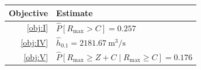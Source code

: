 \begin{tabularx}{\linewidth}{r>{\centering\arraybackslash}X}
\toprule  Objective & Estimate\\\midrule
  \ref{obj:I} & $\hat{P}[R_{\max} > C] = 0.257$\\\addlinespace
  \ref{obj:IV} & $\hat{h}_{0.1} = \qty{2181.67}{\metre\cubed\per\second}$\\\addlinespace
  \ref{obj:V} & $\hat{P}[R_{\max} \ge Z + C \mid R_{\max} \ge C] = 0.176$\\\bottomrule
\end{tabularx}